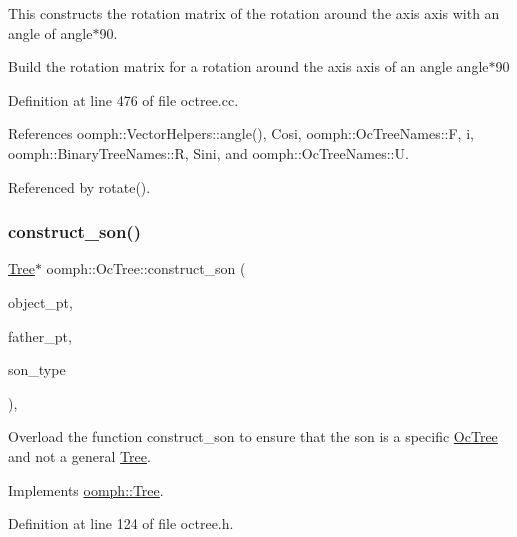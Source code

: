 This constructs the rotation matrix of the rotation around the axis {\ttfamily axis} with an angle of {\ttfamily angle$\ast$90}. 

Build the rotation matrix for a rotation around the axis {\ttfamily axis} of an angle {\ttfamily angle$\ast$90} 

Definition at line 476 of file octree.\+cc.



References oomph\+::\+Vector\+Helpers\+::angle(), Cosi, oomph\+::\+Oc\+Tree\+Names\+::F, i, oomph\+::\+Binary\+Tree\+Names\+::R, Sini, and oomph\+::\+Oc\+Tree\+Names\+::U.



Referenced by rotate().

\mbox{\label{classoomph_1_1OcTree_a2f894bab3cbde60d810de0ee43a9f023}} 
\subsubsection{\texorpdfstring{construct\+\_\+son()}{construct\_son()}}
{\footnotesize\ttfamily \hyperlink{classoomph_1_1Tree}{Tree}$\ast$ oomph\+::\+Oc\+Tree\+::construct\+\_\+son (\begin{DoxyParamCaption}\item[{\hyperlink{classoomph_1_1RefineableElement}{Refineable\+Element} $\ast$const \&}]{object\+\_\+pt,  }\item[{\hyperlink{classoomph_1_1Tree}{Tree} $\ast$const \&}]{father\+\_\+pt,  }\item[{const int \&}]{son\+\_\+type }\end{DoxyParamCaption})\hspace{0.3cm}{\ttfamily [inline]}, {\ttfamily [virtual]}}



Overload the function construct\+\_\+son to ensure that the son is a specific \hyperlink{classoomph_1_1OcTree}{Oc\+Tree} and not a general \hyperlink{classoomph_1_1Tree}{Tree}. 



Implements \hyperlink{classoomph_1_1Tree_a5eb29718044b1bc56403ee9bd15a60b6}{oomph\+::\+Tree}.



Definition at line 124 of file octree.\+h.



